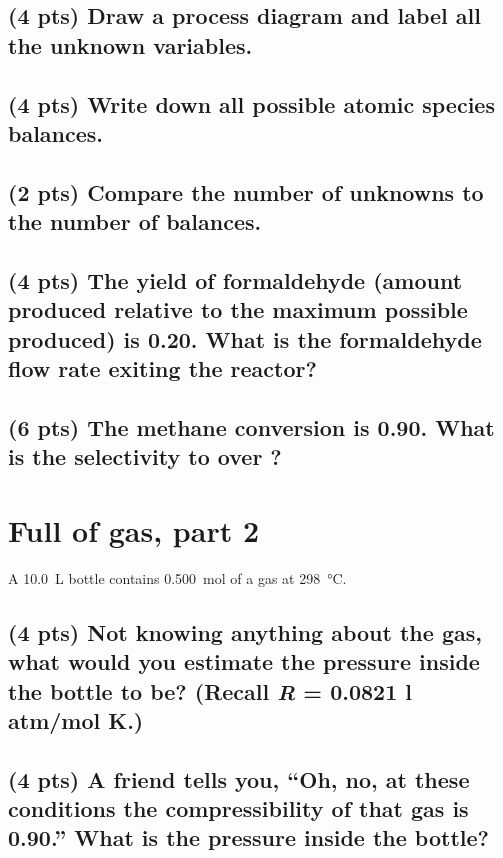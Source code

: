 \documentclass[11pt]{article}
\begin{document}
\subsection{(4 pts) Draw a process diagram and label all the unknown variables.}
\label{sec-1-1}
\vspace{6cm}
\subsection{(4 pts) Write down all possible atomic species balances.}
\label{sec-1-2}
\newpage

\subsection{(2 pts) Compare the number of unknowns to the number of balances.}
\label{sec-1-3}
\vspace{3cm}
\subsection{(4 pts) The yield of formaldehyde (amount produced relative to the maximum possible produced) is 0.20.  What is the formaldehyde flow rate exiting the reactor?}
\label{sec-1-4}

\vspace{6cm}
\subsection{(6 pts) The methane conversion is 0.90. What is the selectivity to  over ?}
\label{sec-1-5}
\newpage
\section{Full of gas, part 2}
\label{sec-2}
A \SI{10.0}{\liter} bottle contains \SI{0.500}{\mole} of a gas at \SI{298}{\celsius}.

\subsection{(4 pts) Not knowing anything about the gas, what would you estimate the pressure inside the bottle to be?  (Recall \emph{R} = 0.0821 l atm/mol K.)}
\label{sec-2-1}
\vspace{8cm}
\subsection{(4 pts) A friend tells you, ``Oh, no, at these conditions the compressibility of that gas is 0.90.''  What is the pressure inside the bottle?}
\label{sec-2-2}
\end{document}
